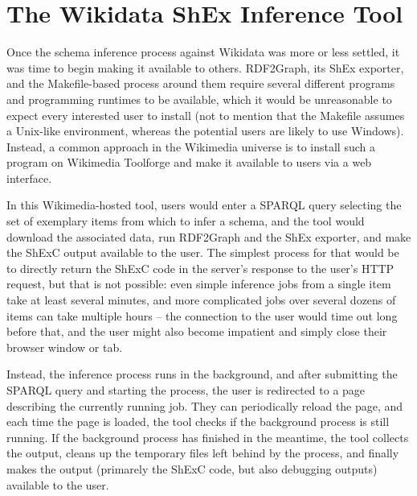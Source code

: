 
\chapter{The Wikidata ShEx Inference Tool}
\label{ch:wdsi}


Once the schema inference process against Wikidata was more or less settled,
it was time to begin making it available to others. %
RDF2Graph, its ShEx exporter, and the Makefile-based process around them
require several different programs and programming runtimes to be available,
which it would be unreasonable to expect every interested user to install
(not to mention that the Makefile assumes a Unix-like environment,
whereas the potential users are likely to use Windows).
Instead, a common approach in the Wikimedia universe
is to install such a program on Wikimedia Toolforge
and make it available to users via a web interface.

In this Wikimedia-hosted tool,
users would enter a SPARQL query selecting the set of exemplary items from which to infer a schema,
and the tool would download the associated data,
run RDF2Graph and the ShEx exporter,
and make the ShExC output available to the user.
The simplest process for that would be
to directly return the ShExC code in the server’s response to the user’s HTTP request,
but that is not possible:
even simple inference jobs %
from a single item take at least several minutes,
and more complicated jobs %
over several dozens of items can take multiple hours –
the connection to the user would time out long before that,
and the user might also become impatient and simply close their browser window or tab.

Instead, the inference process runs in the background,
and after submitting the SPARQL query and starting the process,
the user is redirected to a page describing the currently running job.
They can periodically reload the page,
and each time the page is loaded,
the tool checks if the background process is still running.
If the background process has finished in the meantime,
the tool collects the output,
cleans up the temporary files left behind by the process,
and finally makes the output
(primarely the ShExC code, but also debugging outputs)
available to the user.

